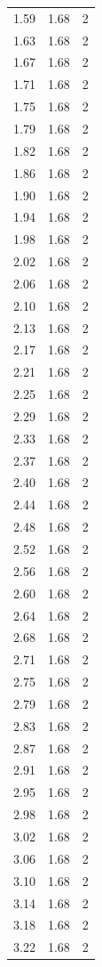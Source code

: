\begin{longtable}{lrr}
  1.59 & 1.68 & 2 \\
  1.63 & 1.68 & 2 \\
  1.67 & 1.68 & 2 \\
  1.71 & 1.68 & 2 \\
  1.75 & 1.68 & 2 \\
  1.79 & 1.68 & 2 \\
  1.82 & 1.68 & 2 \\
  1.86 & 1.68 & 2 \\
  1.90 & 1.68 & 2 \\
  1.94 & 1.68 & 2 \\
  1.98 & 1.68 & 2 \\
  2.02 & 1.68 & 2 \\
  2.06 & 1.68 & 2 \\
  2.10 & 1.68 & 2 \\
  2.13 & 1.68 & 2 \\
  2.17 & 1.68 & 2 \\
  2.21 & 1.68 & 2 \\
  2.25 & 1.68 & 2 \\
  2.29 & 1.68 & 2 \\
  2.33 & 1.68 & 2 \\
  2.37 & 1.68 & 2 \\
  2.40 & 1.68 & 2 \\
  2.44 & 1.68 & 2 \\
  2.48 & 1.68 & 2 \\
  2.52 & 1.68 & 2 \\
  2.56 & 1.68 & 2 \\
  2.60 & 1.68 & 2 \\
  2.64 & 1.68 & 2 \\
  2.68 & 1.68 & 2 \\
  2.71 & 1.68 & 2 \\
  2.75 & 1.68 & 2 \\
  2.79 & 1.68 & 2 \\
  2.83 & 1.68 & 2 \\
  2.87 & 1.68 & 2 \\
  2.91 & 1.68 & 2 \\
  2.95 & 1.68 & 2 \\
  2.98 & 1.68 & 2 \\
  3.02 & 1.68 & 2 \\
  3.06 & 1.68 & 2 \\
  3.10 & 1.68 & 2 \\
  3.14 & 1.68 & 2 \\
  3.18 & 1.68 & 2 \\
  3.22 & 1.68 & 2 \\

\end{longtable}
